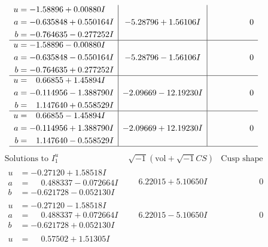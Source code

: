 \documentclass[1p]{elsarticle_modified}
\theoremstyle{definition}
\newcommand{\I}{\sqrt{-1}}
\begin{document}
$$\begin{array}{c|c|c}
\begin{aligned}
u &= -1.58896 + 0.00880 I \\
a &= -0.635848 + 0.550164 I \\
b &= -0.764635 - 0.277252 I\end{aligned}
 & -5.28796 + 1.56106 I & \phantom{-0.000000 } 0 \\ \hline\begin{aligned}
u &= -1.58896 - 0.00880 I \\
a &= -0.635848 - 0.550164 I \\
b &= -0.764635 + 0.277252 I\end{aligned}
 & -5.28796 - 1.56106 I & \phantom{-0.000000 } 0 \\ \hline\begin{aligned}
u &= \phantom{-}0.66855 + 1.45894 I \\
a &= -0.114956 - 1.388790 I \\
b &= \phantom{-}1.147640 + 0.558529 I\end{aligned}
 & -2.09669 - 12.19230 I & \phantom{-0.000000 } 0 \\ \hline\begin{aligned}
u &= \phantom{-}0.66855 - 1.45894 I \\
a &= -0.114956 + 1.388790 I \\
b &= \phantom{-}1.147640 - 0.558529 I\end{aligned}
 & -2.09669 + 12.19230 I & \phantom{-0.000000 } 0\\
 \hline 
 \end{array}$$\newpage$$\begin{array}{c|c|c}  
\text{Solutions to }I^u_{1}& \I (\text{vol} + \sqrt{-1}CS) & \text{Cusp shape}\\
 \hline 
\begin{aligned}
u &= -0.27120 + 1.58518 I \\
a &= \phantom{-}0.488337 - 0.072664 I \\
b &= -0.621728 - 0.052130 I\end{aligned}
 & \phantom{-}6.22015 + 5.10650 I & \phantom{-0.000000 } 0 \\ \hline\begin{aligned}
u &= -0.27120 - 1.58518 I \\
a &= \phantom{-}0.488337 + 0.072664 I \\
b &= -0.621728 + 0.052130 I\end{aligned}
 & \phantom{-}6.22015 - 5.10650 I & \phantom{-0.000000 } 0 \\ \hline\begin{aligned}
u &= \phantom{-}0.57502 + 1.51305 I \\

\end{aligned}
\end{array}$$
\end{document}
